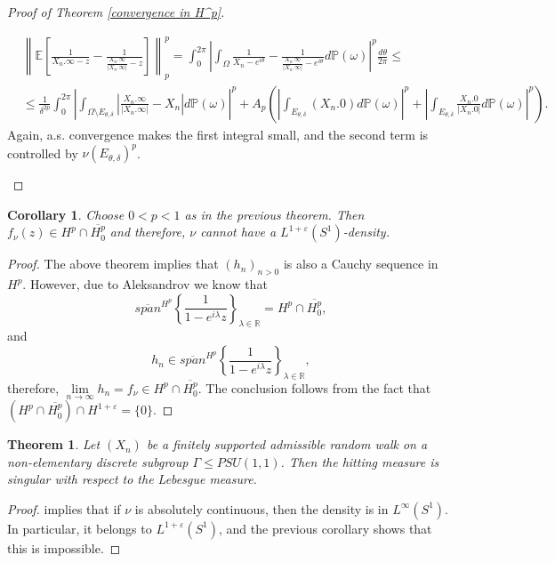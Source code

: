 \documentclass[11pt]{article}
\newtheorem{theorem}{Theorem}[section]
\newtheorem{corollary}{Corollary}[section]
\begin{document}
\begin{proof}[Proof of Theorem \ref{convergence in H^p}]
\begin{itemize}
		\[
		\begin{aligned}
			& \left\| \mathbb{E} \left[\frac{1}{X_n.\infty - z} - \frac{1}{\frac{X_n.\infty}{|X_n.\infty|} - z}\right] \right\|_p^p = \int_0^{2 \pi} \left| \int_{\Omega} \frac{1}{X_n - e^{i \theta}} - \frac{1}{\frac{X_n.\infty}{|X_n.\infty|} - e^{i \theta}} d \mathbb{P}(\omega) \right|^p \frac{d \theta}{2 \pi} \le \\ 
			&\le \frac{1}{\delta^{2 p}} \int_0^{2 \pi} \left| \int_{\Omega \setminus E_{\theta, \delta}} \left|\frac{X_n.\infty}{|X_n.\infty|} - X_n \right| d \mathbb{P}(\omega) \right|^p + A_p \left(  \left| \int_{E_{\theta, \delta}} (X_n.0) d \mathbb{P}(\omega) \right|^p + \left| \int_{E_{\theta, \delta}} \frac{X_n.0}{|X_n.0|} d \mathbb{P}(\omega) \right|^p \right).
		\end{aligned}
		\]
		Again, a.s. convergence makes the first integral small, and the second term is controlled by $\nu(E_{\theta, \delta})^p$.
	\end{itemize}
\end{proof}
\begin{corollary}
	Choose $0 < p < 1$ as in the previous theorem. Then $f_\nu(z) \in H^p \cap \overline{H^p_0}$ and therefore, $\nu$ cannot have a $L^{1+\varepsilon}(S^1)$-density.
\end{corollary}
\begin{proof}
	The above theorem implies that $(h_n)_{n > 0}$ is also a Cauchy sequence in $H^p$. However, due to Aleksandrov we know that
	\[
	\overline{span}^{H^p} \left\lbrace \frac{1}{1 - e^{i\lambda} z} \right\rbrace_{\lambda \in \mathbb{R}} = H^p \cap \overline{H^p_0},
	\]
	and
	\[
	h_n \in \overline{span}^{H^p} \left\lbrace \frac{1}{1 - e^{i\lambda} z} \right\rbrace_{\lambda \in \mathbb{R}},
	\]
	therefore, $\lim\limits_{n \rightarrow \infty} h_n = f_\nu \in H^p \cap \overline{H^p_0}$. The conclusion follows from the fact that $(H^p \cap \overline{H^p_0}) \cap H^{1 + \varepsilon} = \{0\}$.
\end{proof}

\begin{theorem}
	Let $(X_n)$ be a finitely supported admissible random walk on a non-elementary discrete subgroup $\Gamma \leq PSU(1,1)$. Then the hitting measure is singular with respect to the Lebesgue measure.
\end{theorem}
\begin{proof}
	\cite[Theorem 1.5(iii)]{blachere2011harmonic} implies that if $\nu$ is absolutely continuous, then the density is in $L^\infty(S^1)$. In particular, it belongs to $L^{1 + \varepsilon}(S^1)$, and the previous corollary shows that this is impossible.
\end{proof}
\end{document}

